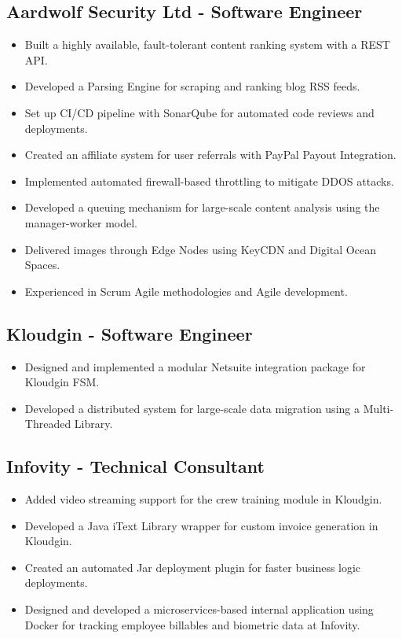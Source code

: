 \documentclass[11pt]{article}
\begin{document}
\subsection{Aardwolf Security Ltd - Software Engineer  }
\begin{itemize}
    \item Built a highly available, fault-tolerant content ranking system with a REST API.
    \item Developed a Parsing Engine for scraping and ranking blog RSS feeds.
    \item Set up CI/CD pipeline with SonarQube for automated code reviews and deployments.
    \item Created an affiliate system for user referrals with PayPal Payout Integration.
    \item Implemented automated firewall-based throttling to mitigate DDOS attacks.
    \item Developed a queuing mechanism for large-scale content analysis using the manager-worker model.
    \item Delivered images through Edge Nodes using KeyCDN and Digital Ocean Spaces.
    \item Experienced in Scrum Agile methodologies and Agile development.
\end{itemize}

\subsection{Kloudgin - Software Engineer  }
\begin{itemize}
    \item Designed and implemented a modular Netsuite integration package for Kloudgin FSM.
    \item Developed a distributed system for large-scale data migration using a Multi-Threaded Library.
\end{itemize}
\subsection{Infovity - Technical Consultant  }
\begin{itemize}
    \item Added video streaming support for the crew training module in Kloudgin.
    \item Developed a Java iText Library wrapper for custom invoice generation in Kloudgin.
    \item Created an automated Jar deployment plugin for faster business logic deployments.
    \item Designed and developed a microservices-based internal application using Docker for tracking employee billables and biometric data at Infovity.
\end{itemize}
\end{document}
